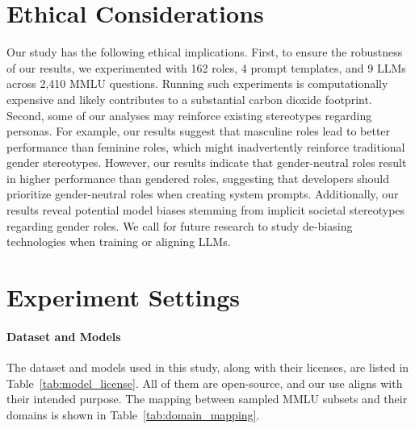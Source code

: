 \documentclass[11pt]{article}
\newcommand{\tref}[1]{Table~\ref{#1}}
\begin{document}
\section{Ethical Considerations}
Our study has the following ethical implications. First, to ensure the robustness of our results, we experimented with 162 roles, 4 prompt templates, and 9 LLMs across 2,410 MMLU questions. Running such experiments is computationally expensive and likely contributes to a substantial carbon dioxide footprint. Second, some of our analyses may reinforce existing stereotypes regarding personas. For example, our results suggest that masculine roles lead to better performance than feminine roles, which might inadvertently reinforce traditional gender stereotypes. However, our results indicate that gender-neutral roles result in higher performance than gendered roles, suggesting that developers should prioritize gender-neutral roles when creating system prompts. Additionally, our results reveal potential model biases stemming from implicit societal stereotypes regarding gender roles. We call for future research to study de-biasing technologies when training or aligning LLMs.





\appendix
\section{Experiment Settings}

\paragraph{Dataset and Models} 

The dataset and models used in this study, along with their licenses, are listed in \tref{tab:model_license}. All of them are open-source, and our use aligns with their intended purpose. The mapping between sampled MMLU subsets and their domains is shown in \tref{tab:domain_mapping}. 

\begin{table}[ht]
    \centering
    \caption{List of licenses}
    \label{tab:model_license}
\end{table}
\end{document}
